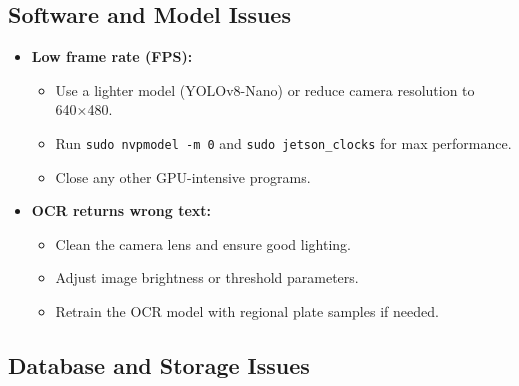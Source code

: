\subsection{Software and Model Issues}
\begin{itemize}
%	
	\item \textbf{Low frame rate (FPS):}
	\begin{itemize}
		\item Use a lighter model (YOLOv8-Nano) or reduce camera resolution to 640×480.  
		\item Run \texttt{sudo nvpmodel -m 0} and \texttt{sudo jetson\_clocks} for max performance.  
		\item Close any other GPU-intensive programs.
	\end{itemize}
	
	\item \textbf{OCR returns wrong text:}
	\begin{itemize}
		\item Clean the camera lens and ensure good lighting.  
		\item Adjust image brightness or threshold parameters.  
		\item Retrain the OCR model with regional plate samples if needed.
	\end{itemize}
\end{itemize}

\subsection{Database and Storage Issues}

